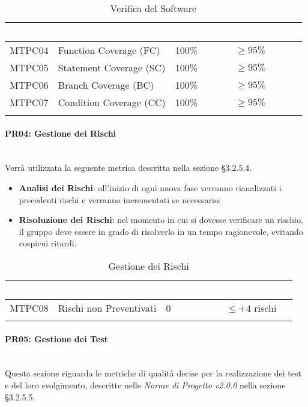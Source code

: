 \begin{longtable}{|C{.15\textwidth}|C{.24\textwidth}|C{.24\textwidth}|C{.24\textwidth}|}
\hline
{}\textbf{\textcolor{white}{ID}} & \textbf{\textcolor{white}{Nome}} & \textbf{\textcolor{white}{Ottimalità}} & \textbf{\textcolor{white}{Accettabilità}}\\
\hline \hline
\endfirsthead
MTPC04 & Function Coverage (FC) & 100\% & $\geqslant 95\%$ \\
\hline
{} MTPC05 & Statement Coverage (SC) & 100\% & $\geqslant 95\%$ \\
\hline
MTPC06 & Branch Coverage (BC) & 100\% & $\geqslant 95\%$ \\
\hline
{}MTPC07 & Condition Coverage (CC) & 100\% & $\geqslant 95\%$ \\
\hline
\caption{Verifica del Software}
\label{VerificaSoftware}
\end{longtable}

\paragraph{PR04: Gestione dei Rischi}\-\\
Verrà utilizzata la seguente metrica descritta nella sezione §3.2.5.4.
\begin{itemize}
	\item \textbf{Analisi dei Rischi}: all'inizio di ogni nuova fase verranno rianalizzati i precedenti rischi e verranno incrementati se necessario;
	\item \textbf{Risoluzione dei Rischi}: nel momento in cui si dovesse verificare un rischio, il gruppo deve essere in grado di risolverlo in un tempo ragionevole, evitando cospicui ritardi.
\end{itemize}

\begin{longtable}{|C{.15\textwidth}|C{.24\textwidth}|C{.24\textwidth}|C{.24\textwidth}|}
\hline
{}\textbf{\textcolor{white}{ID}} & \textbf{\textcolor{white}{Nome}} & \textbf{\textcolor{white}{Ottimalità}} & \textbf{\textcolor{white}{Accettabilità}}\\
\hline \hline
\endfirsthead
MTPC08 & Rischi non Preventivati & 0 & $ \leqslant +4$ rischi \\
\hline
\caption{Gestione dei Rischi}
\label{GestioneRischi}
\end{longtable}

\paragraph{PR05: Gestione dei Test}\-\\
Questa sezione riguarda le metriche di qualità decise per la realizzazione dei test e del loro svolgimento, descritte nelle \textit{Norme di Progetto v2.0.0} nella sezione §3.2.5.5.

